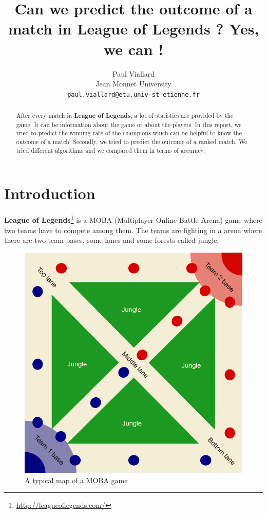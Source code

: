 \documentclass{article}
\title{Can we predict the outcome of a match in League of Legends ? Yes, we can !}
\author{
  Paul Viallard\\
  Jean Monnet University\\
  \texttt{paul.viallard@etu.univ-st-etienne.fr} \\
}
\def\lol{\textbf{League of Legends}}
\begin{document}
\maketitle

\begin{abstract}
  After every match in \lol, a lot of statistics are provided by the game. It can be information about the game or about the players. 
  In this report, we tried to predict the winning rate of the champions which can be helpful to know the outcome of a match. 
  Secondly, we tried to predict the outcome of a ranked match. We tried different algorithms and we compared them in terms of accuracy. 
\end{abstract}

\section{Introduction}

\lol\footnote{\url{http://leagueoflegends.com/}} is a MOBA (Multiplayer Online Battle Arena) game where two teams have to compete among them. The teams are fighting in a arena where there are two team bases, some lanes and some forests called jungle.

\begin{figure}[!hb]
  \includegraphics[scale=0.2]{map.png}
  \centering
  \caption{A typical map of a MOBA game}
\end{figure}
\end{document}
